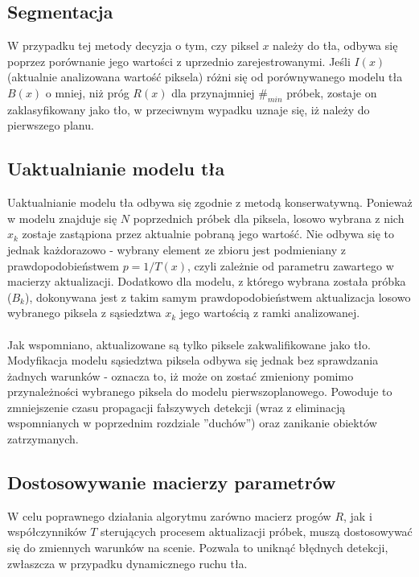 \subsection{Segmentacja}
W przypadku tej metody decyzja o tym, czy piksel $x$ należy do tła, odbywa się poprzez porównanie jego wartości z uprzednio zarejestrowanymi. Jeśli $I(x)$ (aktualnie analizowana wartość piksela) różni się od porównywanego modelu tła $B(x)$ o mniej, niż próg $R(x)$ dla przynajmniej $\#_{min}$ próbek, zostaje on zaklasyfikowany jako tło, w przeciwnym wypadku uznaje się, iż należy do pierwszego planu.
\subsection{Uaktualnianie modelu tła}
Uaktualnianie modelu tła odbywa się zgodnie z metodą konserwatywną. Ponieważ w modelu znajduje się $N$ poprzednich próbek dla piksela, losowo wybrana z nich $x_{k}$ zostaje zastąpiona przez aktualnie pobraną jego wartość. Nie odbywa się to jednak każdorazowo - wybrany element ze zbioru jest podmieniany z prawdopodobieństwem $p = 1/T(x)$, czyli zależnie od parametru zawartego w macierzy aktualizacji. Dodatkowo dla modelu, z którego wybrana została próbka ($B_{k}$), dokonywana jest z takim samym prawdopodobieństwem aktualizacja losowo wybranego piksela z sąsiedztwa $x_{k}$ jego wartością z ramki analizowanej.
\paragraph{}
Jak wspomniano, aktualizowane są tylko piksele zakwalifikowane jako tło. Modyfikacja modelu sąsiedztwa piksela odbywa się jednak bez sprawdzania żadnych warunków - oznacza to, iż może on zostać zmieniony pomimo przynależności wybranego piksela do modelu pierwszoplanowego. Powoduje to zmniejszenie czasu propagacji fałszywych detekcji (wraz z eliminacją wspomnianych w poprzednim rozdziale ''duchów'') oraz zanikanie obiektów zatrzymanych.
\subsection{Dostosowywanie macierzy parametrów}
W celu poprawnego działania algorytmu zarówno macierz progów $R$, jak i współczynników $T$ sterujących procesem aktualizacji próbek, muszą dostosowywać się do zmiennych warunków na scenie. Pozwala to uniknąć błędnych detekcji, zwłaszcza w przypadku dynamicznego ruchu tła.

